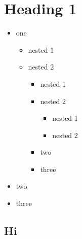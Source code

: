 \documentclass{article}
\begin{document}
 
\setcounter{secnumdepth}{0}

    
\section{Heading 1}
\begin{itemize}
    \item one
\begin{itemize}
    \item nested 1
    \item nested 2
\begin{itemize}
    \item nested 1
    \item nested 2
\begin{itemize}
    \item nested 1
    \item nested 2
\end{itemize}

    \item two
    \item three
\end{itemize}

\end{itemize}

\end{itemize}

\begin{itemize}
    \item two
    \item three
\end{itemize}

\subsection{Hi}
\end{document}

